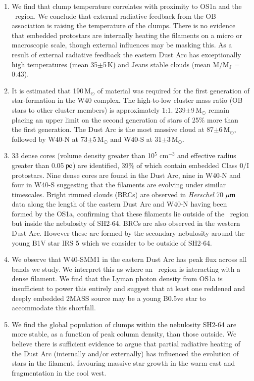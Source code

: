 \begin{enumerate}
\item We find that clump temperature correlates with proximity to OS1a and the \HII\ region. 
We conclude that external radiative feedback from the OB association is raising the temperature 
of the clumps. There is no evidence that embedded protostars are internally heating the 
filaments on a micro or macroscopic scale, though external influences may be masking this. 
As a result of external radiative feedback the eastern Dust Arc has exceptionally high temperatures 
(mean 35$\pm$5\,K) and Jeans stable clouds (mean M/M$_{\mathrm{J}}$ = 0.43). 

\item It is estimated that 190\,M$_{\odot}$ of material was required for the first generation 
of star-formation in the W40 complex. The high-to-low cluster mass ratio (OB stars to other 
cluster members) is approximately 1:1. 239$\pm$9\,M$_{\odot}$ remain placing an upper 
limit on the second generation of stars of 25\% more than the first generation. The Dust Arc 
is the most massive cloud at 87$\pm$6\,M$_{\odot}$, followed by W40-N at 
73$\pm$5\,M$_{\odot}$ and W40-S at 31$\pm$3\,M$_{\odot}$. 

\item 33 dense cores (volume density greater than 10$^{5}$ cm$^{-3}$ and effective radius 
greater than 0.05$\hbox{ pc}$) are identified, 39\% of which contain embedded Class 0/I 
protostars. Nine dense cores are found in the Dust Arc, nine in W40-N and four in W40-S 
suggesting that the filaments are evolving under similar timescales. Bright rimmed clouds 
(BRCs) are observed in \emph{Herschel} 70\,$\,\mu\rm{m}$ data along the length of the eastern 
Dust Arc and W40-N having been formed by the OS1a, confirming that these filaments lie outside of the 
\HII\ region but inside the nebulosity of SH2-64. BRCs are also observed in the western Dust 
Arc. However these are formed by the secondary nebulosity around the young B1V star IRS 5 
which we consider to be outside of SH2-64.

\item We observe that W40-SMM1 in the eastern Dust Arc has peak flux across all bands we 
study. We interpret this as where an \HII\ region is interacting with a dense filament. We find that 
the Lyman photon density from OS1a is insufficient to power this entirely and suggest that at 
least one reddened and deeply embedded 2MASS source may be a young B0.5ve star to 
accommodate this shortfall.

\item We find the global population of clumps within the nebulosity SH2-64 are more stable, 
as a function of peak column density, than those outside. We believe there is sufficient 
evidence to argue that partial radiative heating of the Dust Arc (internally and/or externally) 
has influenced the evolution of stars in the filament, favouring massive star growth in the 
warm east and fragmentation in the cool west. 

\end{enumerate}

